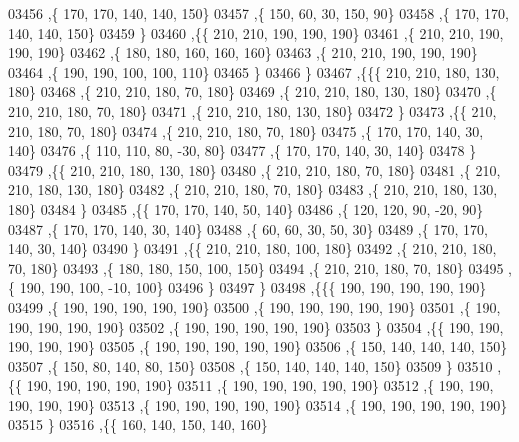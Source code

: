 \begin{DoxyCode}
03456     ,\{   170,   170,   140,   140,   150\}
03457     ,\{   150,    60,    30,   150,    90\}
03458     ,\{   170,   170,   140,   140,   150\}
03459     \}
03460    ,\{\{   210,   210,   190,   190,   190\}
03461     ,\{   210,   210,   190,   190,   190\}
03462     ,\{   180,   180,   160,   160,   160\}
03463     ,\{   210,   210,   190,   190,   190\}
03464     ,\{   190,   190,   100,   100,   110\}
03465     \}
03466    \}
03467   ,\{\{\{   210,   210,   180,   130,   180\}
03468     ,\{   210,   210,   180,    70,   180\}
03469     ,\{   210,   210,   180,   130,   180\}
03470     ,\{   210,   210,   180,    70,   180\}
03471     ,\{   210,   210,   180,   130,   180\}
03472     \}
03473    ,\{\{   210,   210,   180,    70,   180\}
03474     ,\{   210,   210,   180,    70,   180\}
03475     ,\{   170,   170,   140,    30,   140\}
03476     ,\{   110,   110,    80,   -30,    80\}
03477     ,\{   170,   170,   140,    30,   140\}
03478     \}
03479    ,\{\{   210,   210,   180,   130,   180\}
03480     ,\{   210,   210,   180,    70,   180\}
03481     ,\{   210,   210,   180,   130,   180\}
03482     ,\{   210,   210,   180,    70,   180\}
03483     ,\{   210,   210,   180,   130,   180\}
03484     \}
03485    ,\{\{   170,   170,   140,    50,   140\}
03486     ,\{   120,   120,    90,   -20,    90\}
03487     ,\{   170,   170,   140,    30,   140\}
03488     ,\{    60,    60,    30,    50,    30\}
03489     ,\{   170,   170,   140,    30,   140\}
03490     \}
03491    ,\{\{   210,   210,   180,   100,   180\}
03492     ,\{   210,   210,   180,    70,   180\}
03493     ,\{   180,   180,   150,   100,   150\}
03494     ,\{   210,   210,   180,    70,   180\}
03495     ,\{   190,   190,   100,   -10,   100\}
03496     \}
03497    \}
03498   ,\{\{\{   190,   190,   190,   190,   190\}
03499     ,\{   190,   190,   190,   190,   190\}
03500     ,\{   190,   190,   190,   190,   190\}
03501     ,\{   190,   190,   190,   190,   190\}
03502     ,\{   190,   190,   190,   190,   190\}
03503     \}
03504    ,\{\{   190,   190,   190,   190,   190\}
03505     ,\{   190,   190,   190,   190,   190\}
03506     ,\{   150,   140,   140,   140,   150\}
03507     ,\{   150,    80,   140,    80,   150\}
03508     ,\{   150,   140,   140,   140,   150\}
03509     \}
03510    ,\{\{   190,   190,   190,   190,   190\}
03511     ,\{   190,   190,   190,   190,   190\}
03512     ,\{   190,   190,   190,   190,   190\}
03513     ,\{   190,   190,   190,   190,   190\}
03514     ,\{   190,   190,   190,   190,   190\}
03515     \}
03516    ,\{\{   160,   140,   150,   140,   160\}

\end{DoxyCode}
